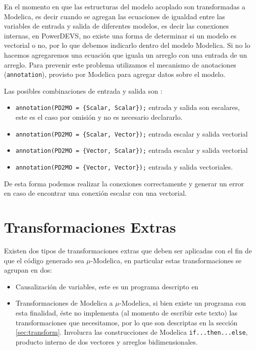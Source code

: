 	En el momento en que las estructuras del modelo acoplado son transformadas a Modelica, es decir cuando se agregan las ecuaciones de igualdad entre las
	variables de entrada y salida de diferentes modelos, es decir las conexiones internas, en PowerDEVS, no existe una forma de determinar si un modelo es 
	vectorial o no, por lo que debemos indicarlo dentro del modelo Modelica. 
	Si no lo hacemos agregaremos una ecuación que iguala un arreglo con una entrada de un arreglo.
	Para prevenir este problema utilizamos el mecanismo de anotaciones (\texttt{annotation}), provisto por Modelica para agregar datos sobre el modelo.

	Las posibles combinaciones de entrada y salida son :

\begin{itemize}
	\item \texttt{annotation(PD2MO = \{Scalar, Scalar\});} entrada y salida son escalares, este es el caso por omisión y no es necesario declararlo.
	\item \texttt{annotation(PD2MO = \{Scalar, Vector\});} entrada escalar y salida vectorial
	\item \texttt{annotation(PD2MO = \{Vector, Scalar\});} entrada escalar y salida vectorial
	\item \texttt{annotation(PD2MO = \{Vector, Vector\});} entrada y salida vectoriales.
\end{itemize}

	De esta forma podemos realizar la conexiones correctamente y generar un error en caso de encontrar una conexión escalar con una vectorial. 

\section{Transformaciones Extras}
	
	Existen dos tipos de transformaciones extras que deben ser aplicadas con el fin de que el código generado sea $\mu$-Modelica, en particular 
	estas transformaciones se agrupan en dos:
	\begin{itemize}
	\item Causalización de variables, este es un programa descripto en \cite{Mod15}
	\item Transformaciones de Modelica a $\mu$-Modelica, si bien existe un programa con esta finalidad, éste no implementa (al momento de escribir este texto)
	las transformaciones que necesitamos, por lo que son descriptas en la sección \ref{sec:transform}. Involucra las construcciones de Modelica 
		\texttt{if...then...else}, producto interno de dos vectores y arreglos bidimensionales.
	\end{itemize}

